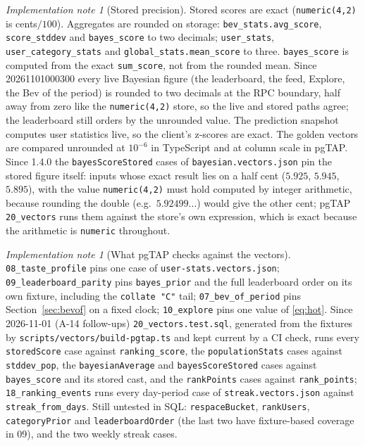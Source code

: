 \documentclass[11pt]{article}
\newcommand{\code}[1]{\texttt{#1}}
\theoremstyle{plain}
\theoremstyle{definition}
\theoremstyle{remark}
\newtheorem{implnote}[theorem]{Implementation note}
\begin{document}
\begin{implnote}[Stored precision]\label{impl:precision}
Stored scores are exact (\code{numeric(4,2)} is cents$/100$). Aggregates are rounded on storage: \code{bev\_stats.avg\_score}, \code{score\_stddev} and \code{bayes\_score} to two decimals; \code{user\_stats}, \code{user\_category\_stats} and \code{global\_stats.mean\_score} to three. \code{bayes\_score} is computed from the exact \code{sum\_score}, not from the rounded mean. Since 20261101000300 every live Bayesian figure (the leaderboard, the feed, Explore, the Bev of the period) is rounded to two decimals at the RPC boundary, half away from zero like the \code{numeric(4,2)} store, so the live and stored paths agree; the leaderboard still orders by the unrounded value. The prediction snapshot computes user statistics live, so the client's z-scores are exact. The golden vectors are compared unrounded at $10^{-6}$ in TypeScript and at column scale in pgTAP. Since 1.4.0 the \code{bayesScoreStored} cases of \code{bayesian.vectors.json} pin the stored figure itself: inputs whose exact result lies on a half cent ($5.925$, $5.945$, $5.895$), with the value \code{numeric(4,2)} must hold computed by integer arithmetic, because rounding the double (e.g.\ $5.92499\ldots$) would give the other cent; pgTAP \code{20\_vectors} runs them against the store's own expression, which is exact because the arithmetic is \code{numeric} throughout.
\end{implnote}

\begin{implnote}[What pgTAP checks against the vectors]\label{impl:vectors}
\code{08\_taste\_profile} pins one case of \code{user-stats.vectors.json}; \code{09\_leaderboard\_parity} pins \code{bayes\_prior} and the full leaderboard order on its own fixture, including the \code{collate "C"} tail; \code{07\_bev\_of\_period} pins Section~\ref{sec:bevof} on a fixed clock; \code{10\_explore} pins one value of \eqref{eq:hot}. Since 2026-11-01 (A-14 follow-ups) \code{20\_vectors.test.sql}, generated from the fixtures by \code{scripts/vectors/build-pgtap.ts} and kept current by a CI check, runs every \code{storedScore} case against \code{ranking\_score}, the \code{populationStats} cases against \code{stddev\_pop}, the \code{bayesianAverage} and \code{bayesScoreStored} cases against \code{bayes\_score} and its stored cast, and the \code{rankPoints} cases against \code{rank\_points}; \code{18\_ranking\_events} runs every day-period case of \code{streak.vectors.json} against \code{streak\_from\_days}. Still untested in SQL: \code{respaceBucket}, \code{rankUsers}, \code{categoryPrior} and \code{leaderboardOrder} (the last two have fixture-based coverage in 09), and the two weekly streak cases.
\end{implnote}
\end{document}
